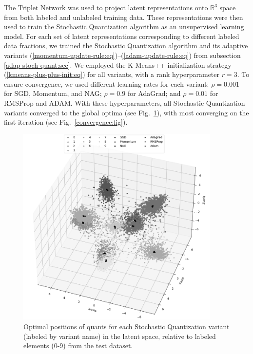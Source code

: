 The Triplet Network was used to project latent representations onto $\mathbb{R}^3$ space from both labeled and unlabeled training data. These representations were then used to train the Stochastic Quantization algorithm as an unsupervised learning model. For each set of latent representations corresponding to different labeled data fractions, we trained the Stochastic Quantization algorithm and its adaptive variants (\ref{momentum-update-rule:eq})--(\ref{adam-update-rule:eq}) from subsection \ref{adap-stoch-quant:sec}. We employed the K-Means++ initialization strategy (\ref{kmeans-plus-plus-init:eq}) for all variants, with a rank hyperparameter $r = 3$. To ensure convergence, we used different learning rates for each variant: $\rho = 0.001$ for SGD, Momentum, and NAG; $\rho = 0.9$ for AdaGrad; and $\rho = 0.01$ for RMSProp and ADAM. With these hyperparameters, all Stochastic Quantization variants converged to the global optima (see Fig.~\ref{quants:fig}), with most converging on the first iteration (see Fig.~\ref{convergence:fig}).
\begin{figure}
    \centering
    \includegraphics[width=0.9\textwidth]{figures/sq_quants.png}
    \caption{Optimal positions of quants for each Stochastic Quantization variant (labeled by variant name) in the latent space, relative to labeled elements (0-9) from the test dataset.}
    \label{quants:fig}
\end{figure}
